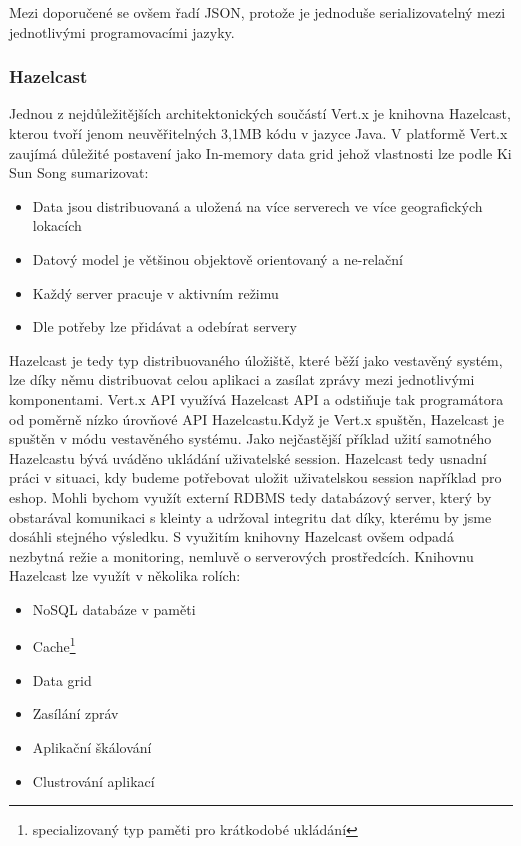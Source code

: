 Mezi doporučené se ovšem řadí JSON, protože je jednoduše serializovatelný mezi jednotlivými programovacími jazyky.

\subsubsection{Hazelcast}\label{sub:hazelcast}

Jednou z nejdůležitějších architektonických součástí Vert.x je knihovna Hazelcast, kterou tvoří jenom neuvěřitelných 3,1MB kódu v jazyce Java. V platformě Vert.x zaujímá důležité postavení jako In-memory data grid jehož vlastnosti \cite{inMemoryDataGrid} lze podle Ki Sun Song sumarizovat:
\begin{itemize}
\item{Data jsou distribuovaná a uložená na více serverech ve více geografických lokacích}
\item{Datový model je většinou objektově orientovaný a ne-relační}
\item{Každý server pracuje v aktivním režimu}
\item{Dle potřeby lze přidávat a odebírat servery}
\end{itemize}

Hazelcast je tedy typ distribuovaného úložiště, které běží jako vestavěný systém, lze díky němu distribuovat celou aplikaci a zasílat zprávy mezi jednotlivými komponentami. Vert.x API využívá Hazelcast API a odstiňuje tak programátora od poměrně nízko úrovňové API Hazelcastu.Když je Vert.x spuštěn, Hazelcast je spuštěn v módu vestavěného systému. Jako nejčastější příklad užití samotného Hazelcastu bývá uváděno ukládání uživatelské session\cite{session}. Hazelcast tedy usnadní práci v situaci, kdy budeme potřebovat uložit uživatelskou session například pro eshop. Mohli bychom využít externí RDBMS tedy databázový server, který by obstarával komunikaci s kleinty a udržoval integritu dat díky, kterému by jsme dosáhli stejného výsledku. S využitím knihovny Hazelcast ovšem odpadá nezbytná režie a monitoring, nemluvě o serverových prostředcích.
Knihovnu Hazelcast lze využít v několika rolích:
\begin{itemize}
\item{NoSQL databáze v paměti}
\item{Cache\footnote{specializovaný typ paměti pro krátkodobé ukládání}}
\item{Data grid}
\item{Zasílání zpráv}
\item{Aplikační škálování}
\item{Clustrování aplikací}
\end{itemize}

